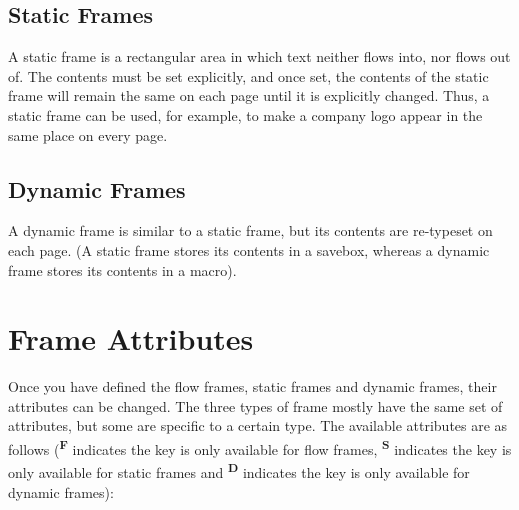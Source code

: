 \documentclass[a4paper]{article}
\begin{document}
\subsection{Static Frames}

A static frame is a rectangular area in which text neither
flows into, nor flows out of.  The contents must be set
explicitly, and once set, the contents of the static frame will
remain the same on each page until it is explicitly 
changed.  Thus, a static frame can be used, for example, to make 
a company logo appear in the same place on every page.

\subsection{Dynamic Frames}

A dynamic frame is similar to a static frame, but its contents
are re-typeset on each page. (A static frame stores its 
contents in a savebox, whereas a dynamic frame stores its
contents in a macro).


\section{Frame Attributes}
\label{sec:modattr}

Once you have defined the {flow frames}, {static frames} and 
{dynamic frames}, their attributes can be changed. 
The three types of frame mostly have the 
same set of attributes, but some are specific to a certain type.
The available attributes are as follows
(\textsuperscript{\textbf{F}} indicates the key is
only available for {flow frames}, 
\textsuperscript{\textbf{S}} indicates the key is only available 
for {static frames}
and \textsuperscript{\textbf{D}} indicates the key
is only available for {dynamic frames}):
\end{document}
